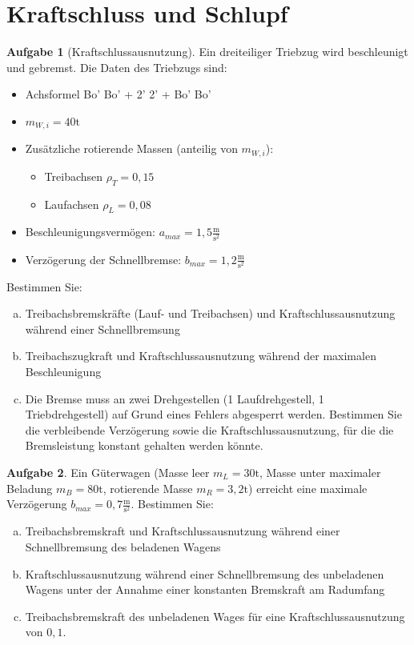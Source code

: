 \documentclass[10pt,a4paper,headsepline,smallheadings]{scrartcl}
\theoremstyle{definition}
\newtheorem{aufgabe}{Aufgabe}
\begin{document}
\section*{Kraftschluss und Schlupf}
\begin{aufgabe}[Kraftschlussausnutzung]
Ein dreiteiliger Triebzug wird beschleunigt und gebremst. Die Daten des Triebzugs sind:
\begin{itemize}
	\item Achsformel Bo' Bo' + 2' 2' + Bo' Bo'
	\item $m_{W,i} = 40 \mathrm{t}$
	\item Zus\"atzliche rotierende Massen (anteilig von $m_{W,i}$):
	\begin{itemize}
		\item Treibachsen $\rho_{T} = 0{,}15$
		\item Laufachsen $\rho_{L} = 0{,}08$
	\end{itemize} 
	\item Beschleunigungsverm\"ogen: $a_{max} = 1{,}5 \frac{\mathrm{m}}{\mathrm{s}^2}$
	\item Verz\"ogerung der Schnellbremse: $b_{max} = 1{,}2 \frac{\mathrm{m}}{\mathrm{s}^2}$
\end{itemize} 

Bestimmen Sie:
\begin{enumerate}[a)]
\item Treibachsbremskr\"afte (Lauf- und Treibachsen) und Kraftschlussausnutzung w\"ahrend einer Schnellbremsung
\item Treibachszugkraft und Kraftschlussausnutzung w\"ahrend der maximalen Beschleunigung
\item Die Bremse muss an zwei Drehgestellen (1 Laufdrehgestell, 1 Triebdrehgestell) auf Grund eines Fehlers abgesperrt werden. Bestimmen Sie die verbleibende Verz\"ogerung sowie die Kraftschlussausnutzung, f\"ur die die Bremsleistung konstant gehalten werden k\"onnte.
\end{enumerate}
\end{aufgabe}
\vspace{0.5cm}
\begin{aufgabe}
Ein G\"uterwagen (Masse leer $m_{L} = 30 \mathrm{t}$, Masse unter maximaler Beladung $m_{B} = 80 \mathrm{t}$, rotierende Masse $m_{R} = 3{,}2 \mathrm{t}$) erreicht eine maximale Verz\"ogerung $b_{max} = 0{,}7 \frac{\mathrm{m}}{\mathrm{s}^2}$.
Bestimmen Sie:
\begin{enumerate}[a)]
\item Treibachsbremskraft und Kraftschlussausnutzung w\"ahrend einer Schnellbremsung des beladenen Wagens
\item Kraftschlussausnutzung w\"ahrend einer Schnellbremsung des unbeladenen Wagens unter der Annahme einer konstanten Bremskraft am Radumfang
\item Treibachsbremskraft des unbeladenen Wages f\"ur eine Kraftschlussausnutzung von $0{,1}$.
\end{enumerate}

\end{aufgabe}
\end{document}
